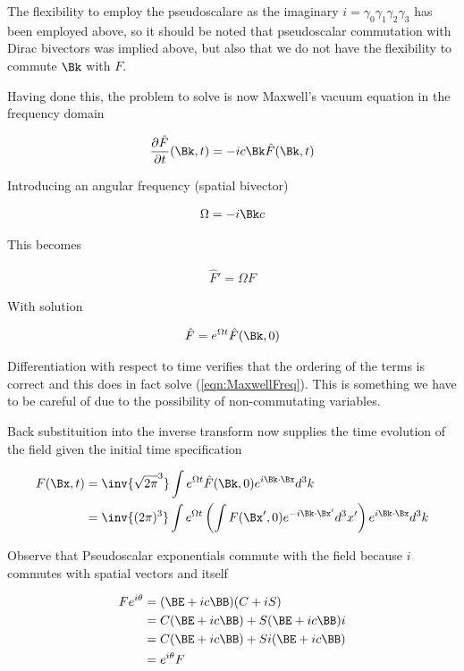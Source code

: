 \documentclass[]{eliblog}
\begin{document}
The flexibility to employ the pseudoscalare as the imaginary $i = \gamma_0 \gamma_1 \gamma_2 \gamma_3$ has been employed above, so it should
be noted that pseudoscalar commutation with Dirac bivectors was implied above, but also that we do not have the flexibility to commute $\Bk$ with $F$.

Having done this, the problem to solve is now Maxwell's vacuum equation in the frequency domain

\begin{align*}
\PD{t}{\hat{F}}(\Bk,t) = -i c \Bk \hat{F}(\Bk,t)
\end{align*}

Introducing an angular frequency (spatial bivector)

\begin{align*}
\Omega = -i \Bk c
\end{align*}

This becomes

\begin{align}\label{eqn:MaxwellFreq}
\hat{F}' = \Omega F
\end{align}

With solution

\begin{align}
\hat{F} = e^{\Omega t} \hat{F}(\Bk,0)
\end{align}

Differentiation with respect to time verifies that the ordering of the terms is correct and this does in fact solve (\ref{eqn:MaxwellFreq}).  This
is something we have to be careful of due to the possibility of non-commutating variables.

Back substituition into the inverse transform now supplies the time evolution of the field given the initial time specification

\begin{align*}
F(\Bx,t)
&= \inv{\sqrt{2\pi}^3} \int e^{\Omega t} \hat{F}(\Bk,0) e^{i \Bk \cdot \Bx} d^3 k \\
&= \inv{(2\pi)^3} \int e^{\Omega t} \left( \int {F}(\Bx',0) e^{-i \Bk \cdot \Bx'} d^3 x' \right) e^{i \Bk \cdot \Bx} d^3 k
\end{align*}

Observe that Pseudoscalar exponentials commute with the field because $i$ commutes with spatial vectors and itself

\begin{align*}
F e^{i\theta}
&= (\BE + i c \BB) (C + iS) \\
&=
C (\BE + i c \BB)
+ S (\BE + i c \BB) i  \\
&=
C (\BE + i c \BB)
+ S i (\BE + i c \BB) \\
&=
e^{i\theta} F
\end{align*}
\end{document}
